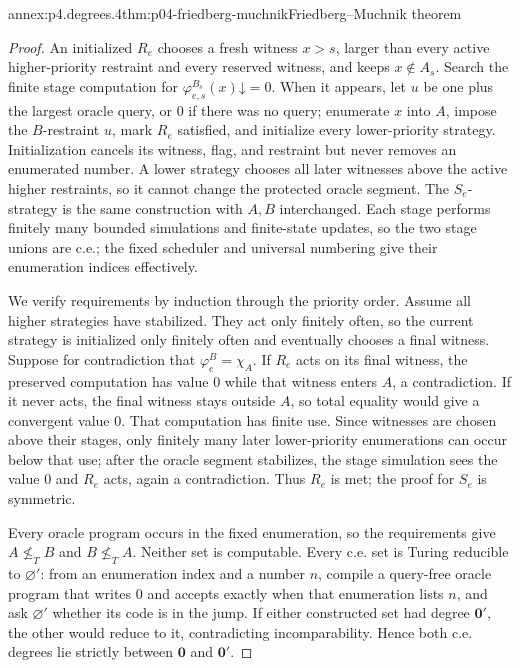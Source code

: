 \begin{annexitem}{annex:p4.degrees.4}{thm:p04-friedberg-muchnik}{Friedberg--Muchnik theorem}
\begin{proof}
An initialized \(R_e\) chooses a fresh witness \(x>s\), larger than every
active higher-priority restraint and every reserved witness, and keeps
\(x\notin A_s\).  Search the finite stage computation for
\(\varphi_{e,s}^{B_s}(x)\mathord\downarrow=0\).  When it appears, let \(u\)
be one plus the largest oracle query, or \(0\) if there was no query; enumerate
\(x\) into \(A\), impose the \(B\)-restraint \(u\), mark \(R_e\) satisfied,
and initialize every lower-priority strategy.  Initialization cancels its
witness, flag, and restraint but never removes an enumerated number.  A lower
strategy chooses all later witnesses above the active higher restraints, so
it cannot change the protected oracle segment.  The \(S_e\)-strategy is the
same construction with \(A,B\) interchanged.  Each stage performs finitely
many bounded simulations and finite-state updates, so the two stage unions are
c.e.; the fixed scheduler and universal numbering give their enumeration
indices effectively.

We verify requirements by induction through the priority order.  Assume all
higher strategies have stabilized.  They act only finitely often, so the
current strategy is initialized only finitely often and eventually chooses a
final witness.  Suppose for contradiction that
\(\varphi_e^B=\chi_A\).  If \(R_e\) acts on its final witness, the preserved
computation has value \(0\) while that witness enters \(A\), a contradiction.
If it never acts, the final witness stays outside \(A\), so total equality
would give a convergent value \(0\).  That computation has finite use.  Since
witnesses are chosen above their stages, only finitely many later lower-priority
enumerations can occur below that use; after the oracle segment stabilizes,
the stage simulation sees the value \(0\) and \(R_e\) acts, again a
contradiction.  Thus \(R_e\) is met; the proof for \(S_e\) is symmetric.

Every oracle program occurs in the fixed enumeration, so the requirements
give \(A\not\leq_TB\) and \(B\not\leq_TA\).  Neither set is computable.  Every
c.e. set is Turing reducible to \(\varnothing'\): from an enumeration index
and a number \(n\), compile a query-free oracle program that writes \(0\) and
accepts exactly when that enumeration lists \(n\), and ask
\(\varnothing'\) whether its code is in
the jump.  If either constructed set had
degree \(\mathbf0'\), the other would reduce to it, contradicting
incomparability.  Hence both c.e. degrees lie strictly between
\(\mathbf0\) and \(\mathbf0'\).
\end{proof}
\end{annexitem}
